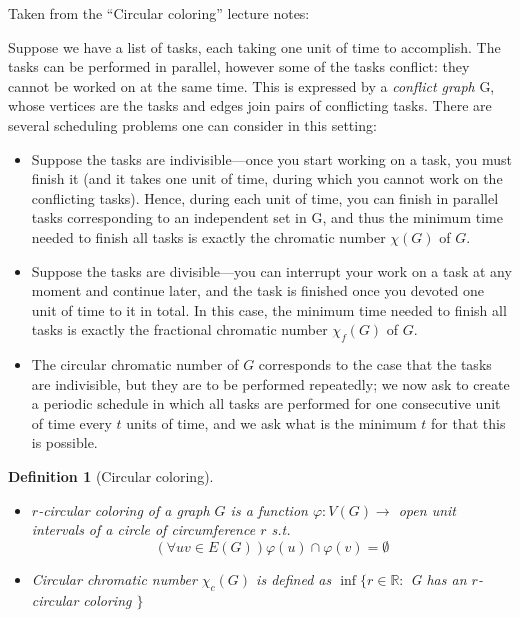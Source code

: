 \documentclass{article}
\newtheorem*{definition}{Definition}
\begin{document}
\noindent
Taken from the \enquote{Circular coloring} lecture notes:

\noindent
Suppose we have a list of tasks, each taking one unit of time to accomplish.
The tasks can be performed in parallel, however some of the tasks conflict:
they cannot be worked on at the same time. This is expressed by a
\emph{conflict graph} G, whose vertices are the tasks and edges join pairs of
conflicting tasks. There are several scheduling problems one can consider in
this setting:

\begin{itemize}
	\item Suppose the tasks are indivisible—once you start working on a
		task, you must finish it (and it takes one unit of time, during
		which you cannot work on the conflicting tasks). Hence, during
		each unit of time, you can finish in parallel tasks
		corresponding to an independent set in G, and thus the minimum
		time needed to finish all tasks is exactly the chromatic number
		$\chi(G)$ of $G$.
	\item Suppose the tasks are divisible—you can interrupt your work on a
		task at any moment and continue later, and the task is finished
		once you devoted one unit of time to it in total. In this case,
		the minimum time needed to finish all tasks is exactly the
		fractional chromatic number $\chi_f(G)$ of $G$.
	\item The circular chromatic number of $G$ corresponds to the case
		that the tasks are indivisible, but they are to be performed
		repeatedly; we now ask to create a periodic schedule in which
		all tasks are performed for one consecutive unit of time every
		$t$ units of time, and we ask what is the minimum $t$ for that
		this is possible.
\end{itemize}

\begin{definition}[Circular coloring]
	~
	\begin{itemize}
		\item \emph{$r$-circular coloring} of a graph $G$ is a function
			$\varphi: V(G) \rightarrow$ open unit intervals of a
			circle of circumference $r$ s.t. $$ (\forall uv \in
			E(G)) \varphi(u) \cap \varphi(v) = \emptyset $$
		\item \emph{Circular chromatic number} $\chi_c(G)$ is defined
			as $\inf\{r \in \mathbb{R}:$ G has an $r$-circular
			coloring $\}$
	\end{itemize}
\end{definition}
\end{document}

